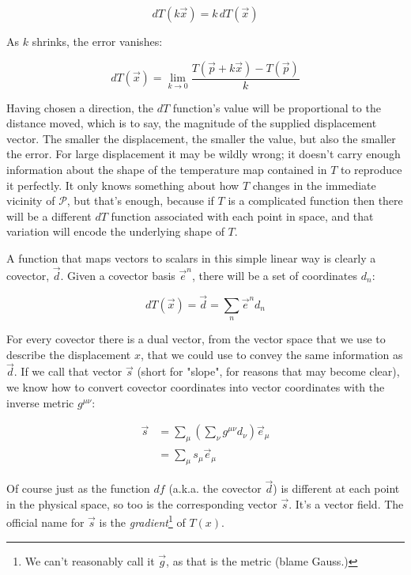 $$
dT(k \vec{x}) = k \, dT(\vec{x})
$$

As $k$ shrinks, the error vanishes:

\begin{equation}
    dT(\vec{x}) = \lim_{k \to 0} \frac{T(\vec{p} + k\vec{x}) - T(\vec{p})}{k}
    \label{eqn:directional-derivative-limit}
\end{equation}

Having chosen a direction, the $dT$ function's value will be proportional to the distance moved, which is to say, the magnitude of the supplied displacement vector. The smaller the displacement, the smaller the value, but also the smaller the error. For large displacement it may be wildly wrong; it doesn't carry enough information about the shape of the temperature map contained in $T$ to reproduce it perfectly. It only knows something about how $T$ changes in the immediate vicinity of $\mathcal{P}$, but that's enough, because if $T$ is a complicated function then there will be a different $dT$ function associated with each point in space, and that variation will encode the underlying shape of $T$.

A function that maps vectors to scalars in this simple linear way is clearly a covector, $\vec{d}$. Given a covector basis $\vec{e}^n$, there will be a set of coordinates $d_n$:

\begin{equation}
    dT(\vec{x}) = \vec{d} = \sum_n \vec{e}^n d_n
    \label{eqn:covector-directional-derivative}
\end{equation}

For every covector there is a dual vector, from the vector space that we use to describe the displacement $x$, that we could use to convey the same information as $\vec{d}$. If we call that vector $\vec{s}$ (short for "slope", for reasons that may become clear), we know how to convert covector coordinates into vector coordinates with the inverse metric $g^{\mu\nu}$:

\begin{equation}
\begin{split}
\vec{s} 
&= \sum_{\mu} \left( \sum_{\nu} g^{\mu\nu} d_{\nu} \right) \vec{e}_{\mu} \\
&= \sum_{\mu} s_{\mu} \vec{e}_{\mu}
\label{eqn:vector-gradient}
\end{split}
\end{equation}

Of course just as the function $df$ (a.k.a. the covector $\vec{d}$) is different at each point in the physical space, so too is the corresponding vector $\vec{s}$. It's a vector field. The official name for $\vec{s}$ is the \textit{gradient}\footnote{We can't reasonably call it $\vec{g}$, as that is the metric (blame Gauss.)} of $T(x)$.

